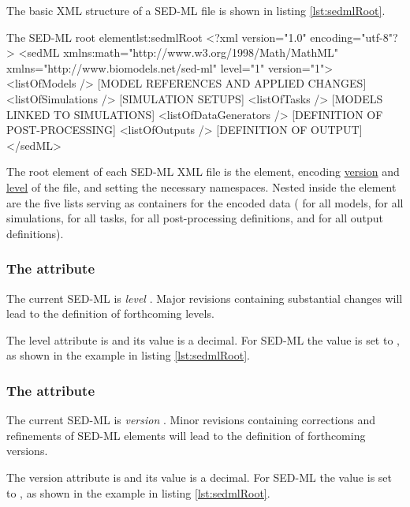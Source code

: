 The basic XML structure of a SED-ML file is shown in listing  \ref{lst:sedmlRoot}.
%
\begin{myXmlLst}{The SED-ML root element}{lst:sedmlRoot}
<?xml version="1.0" encoding="utf-8"?>
<sedML xmlns:math="http://www.w3.org/1998/Math/MathML" 
       xmlns="http://www.biomodels.net/sed-ml" level="1" version="1">
 <listOfModels />
  [MODEL REFERENCES AND APPLIED CHANGES]
 <listOfSimulations />
  [SIMULATION SETUPS]
 <listOfTasks />
  [MODELS LINKED TO SIMULATIONS]
 <listOfDataGenerators />
  [DEFINITION OF POST-PROCESSING]
 <listOfOutputs />
  [DEFINITION OF OUTPUT]
</sedML>
\end{myXmlLst}
%
The root element of each SED-ML XML file is the  element, encoding \hyperref[sec:version]{version} and \hyperref[sec:level]{level} of the file, and setting the necessary namespaces. Nested inside the  element are the five lists serving as containers for the encoded data ( for all models,  for all simulations,  for all tasks,  for all post-processing definitions, and  for all output definitions).

\subsubsection{The  attribute}
\label{sec:level}

The current SED-ML  is  \emph{level \level}. Major revisions containing substantial changes will lead to the definition of forthcoming levels.

The level attribute is  and its value is a  decimal. For SED-ML \LoneVone the value is set to , as shown in the example in listing \ref{lst:sedmlRoot}.

\subsubsection{The  attribute}
\label{sec:version}
The current SED-ML  is \emph{version \version}. Minor revisions containing corrections and refinements of SED-ML elements will lead to the definition of forthcoming versions.

The version attribute is  and its value is a  decimal. For SED-ML \LoneVone the value is set to , as shown in the example in listing \ref{lst:sedmlRoot}.



